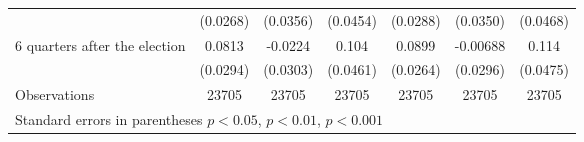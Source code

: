 \begin{table}[!ht]
\begin{tabular}{l*{6}{c}}
                    &    (0.0268)         &    (0.0356)         &    (0.0454)         &    (0.0288)         &    (0.0350)         &    (0.0468)         \\
[0.5em]
 6 quarters after the election&      0.0813\sym{**} &     -0.0224         &       0.104\sym{*}  &      0.0899\sym{***}&    -0.00688         &       0.114\sym{*}  \\
                    &    (0.0294)         &    (0.0303)         &    (0.0461)         &    (0.0264)         &    (0.0296)         &    (0.0475)         \\
\hline
Observations        &       23705         &       23705         &       23705         &       23705         &       23705         &       23705         \\
\hline\hline
\multicolumn{7}{l}{ Standard errors in parentheses \sym{*} \(p<0.05\), \sym{**} \(p<0.01\), \sym{***} \(p<0.001\)}\\\end{tabular}
\end{table}
